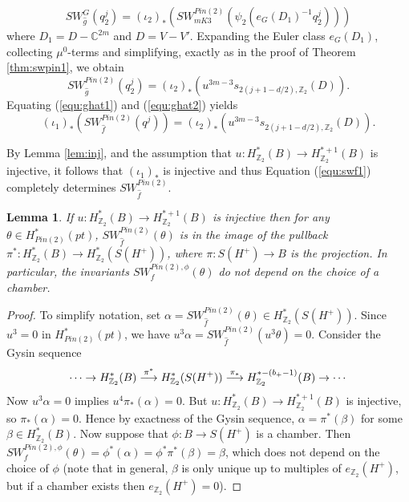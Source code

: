 \documentclass{amsart}
\newtheorem{lemma}[theorem]{Lemma}
\theoremstyle{definition}
\theoremstyle{remark}
\numberwithin{equation}{section}
\begin{document}
\[
SW^{G}_{\widehat{g}}(q_2^j) = (\iota_2)_*( SW^{Pin(2)}_{mK3}(  \psi_2( e_G(D_1)^{-1} q_2^j )))
\]
where $D_1 = D - \mathbb{C}^{2m}$ and $D = V - V'$. Expanding the Euler class $e_G(D_1)$, collecting $\mu^0$-terms and simplifying, exactly as in the proof of Theorem \ref{thm:swpin1}, we obtain
\begin{equation}\label{equ:ghat2}
SW^{Pin(2)}_{\widehat{g}}(q_2^j) = (\iota_2)_* ( u^{3m-3} s_{2(j+1-d/2) , \mathbb{Z}_2}(D) ).
\end{equation}
Equating (\ref{equ:ghat1}) and (\ref{equ:ghat2}) yields
\begin{equation}\label{equ:swf1}
(\iota_1)_*( SW^{Pin(2)}_{\widehat{f}}(q^j)) =  (\iota_2)_* ( u^{3m-3} s_{2(j+1-d/2), \mathbb{Z}_2}(D) ).
\end{equation}


By Lemma \ref{lem:inj}, and the assumption that $u : H^*_{\mathbb{Z}_2}(B) \to H^{*+1}_{\mathbb{Z}_2}(B)$ is injective, it follows that $(\iota_1)_*$ is injective and thus Equation (\ref{equ:swf1}) completely determines $SW^{Pin(2)}_{\widehat{f}}$.

\begin{lemma}\label{lem:pullback}
If $u : H^*_{\mathbb{Z}_2}(B) \to H^{*+1}_{\mathbb{Z}_2}(B)$ is injective then for any $\theta \in H^*_{Pin(2)}(pt)$, $SW^{Pin(2)}_{\widehat{f}}(\theta)$ is in the image of the pullback $\pi^* : H^*_{\mathbb{Z}_2}(B) \to H^*_{\mathbb{Z}_2}( S(H^+) )$, where $\pi : S(H^+) \to B$ is the projection. In particular, the invariants $SW_{f}^{Pin(2),\phi}(\theta)$ do not depend on the choice of a chamber.
\end{lemma}
\begin{proof}
To simplify notation, set $\alpha = SW^{Pin(2)}_{\widehat{f}}(\theta) \in H^*_{\mathbb{Z}_2}( S(H^+) )$. Since $u^3 = 0$ in $H^*_{Pin(2)}(pt)$, we have $u^3 \alpha = SW^{Pin(2)}_{\widehat{f}}(u^3 \theta) = 0$. Consider the Gysin sequence
\[
\cdots \to H^*_{\mathbb{Z}_2}( B ) \buildrel \pi^* \over \longrightarrow H^*_{\mathbb{Z}_2}(S(H^+)) \buildrel \pi_* \over \longrightarrow H^{*-(b_+-1)}_{\mathbb{Z}_2}(B) \to \cdots
\]
Now $u^3 \alpha = 0$ implies $u^4 \pi_*(\alpha) = 0$. But $u : H^*_{\mathbb{Z}_2}(B) \to H^{*+1}_{\mathbb{Z}_2}(B)$ is injective, so $\pi_*(\alpha) = 0$. Hence by exactness of the Gysin sequence, $\alpha = \pi^*(\beta)$ for some $\beta \in H^*_{\mathbb{Z}_2}(B)$. Now suppose that $\phi : B \to S(H^+)$ is a chamber. Then $SW^{Pin(2),\phi}_{f}( \theta ) = \phi^*( \alpha ) = \phi^* \pi^*(\beta) = \beta$, which does not depend on the choice of $\phi$ (note that in general, $\beta$ is only unique up to multiples of $e_{\mathbb{Z}_2}(H^+)$, but if a chamber exists then $e_{\mathbb{Z}_2}(H^+) = 0$).
\end{proof}
\end{document}

